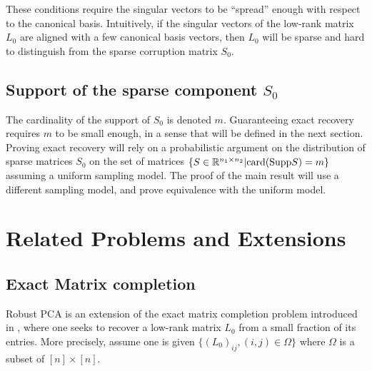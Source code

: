 \documentclass{../common/projectreport}
\begin{document}
These conditions require the singular vectors to be ``spread'' enough with respect to the canonical basis. Intuitively, if the singular vectors of the low-rank matrix $L_0$ are aligned with a few canonical basis vectors, then $L_0$ will be sparse and hard to distinguish from the sparse corruption matrix $S_0$.



\subsection{Support of the sparse component $S_0$}
The cardinality of the support of $S_0$ is denoted $m$. Guaranteeing exact recovery requires $m$ to be small enough, in a sense that will be defined in the next section. Proving exact recovery will rely on a probabilistic argument on the distribution of sparse matrices $S_0$ on the set of matrices $\{ S \in {\mathbb R}^{n_1 \times n_2} | \text{card}(\text{Supp}S) = m \}$assuming a uniform sampling model. The proof of the main result will use a different sampling model, and prove equivalence with the uniform model.








\newpage
\section{Related Problems and Extensions}


\subsection{Exact Matrix completion}
Robust PCA is an extension of the exact matrix completion problem introduced in \cite{Candes:2009uq}, where one seeks to recover a low-rank matrix $L_0$ from a small fraction of its entries. More precisely, assume one is given $\{(L_0)_{ij}, (i,j)\in \Omega\}$ where $\Omega$ is a subset of $[n]\times [n]$.
\end{document}
